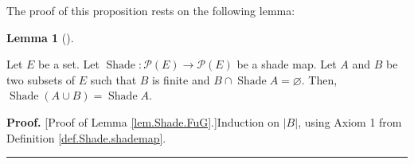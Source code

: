 \documentclass[numbers=enddot,12pt,final,onecolumn]{scrartcl}%
\theoremstyle{definition}
\newtheorem{lem}[theo]{Lemma}
\newenvironment{lemma}[1][]
{\begin{lem}[#1]\begin{leftbar}}
{\end{leftbar}\end{lem}}
\newenvironment{proof}[1][Proof]{\noindent\textbf{#1.} }{\ \rule{0.5em}{0.5em}}
\newenvironment{vershort}{}{}
\begin{document}
The proof of this proposition rests on the following lemma:

\begin{lemma}
\label{lem.Shade.FuG}Let $E$ be a set. Let $\operatorname*{Shade}%
:\mathcal{P}\left(  E\right)  \rightarrow\mathcal{P}\left(  E\right)  $ be a
shade map. Let $A$ and $B$ be two subsets of $E$ such that $B$ is finite and
$B\cap\operatorname*{Shade}A=\varnothing$. Then, $\operatorname*{Shade}\left(
A\cup B\right)  =\operatorname*{Shade}A$.
\end{lemma}

\begin{vershort}


\begin{proof}
[Proof of Lemma \ref{lem.Shade.FuG}.]Induction on $\left\vert B\right\vert $,
using Axiom 1 from Definition \ref{def.Shade.shademap}.
\end{proof}
\end{vershort}
\end{document}
